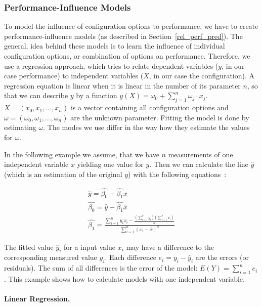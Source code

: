 \subsubsection{Performance-Influence Models}
\label{lin_reg}

To model the influence of configuration options to performance, we have to create performance-influence models (as described in Section~\ref{rel_perf_pred}). The general, idea behind these models is to learn the influence of individual configuration options, or combination of options on performance. Therefore, we use a regression approach, which tries to relate dependent variables ($y$, in our case performance) to independent variables ($X$, in our case the configuration). A regression equation is linear when it is linear in the number of its parameter $n$, so that we can describe $y$ by a function $y(X) = \omega_0 + \sum_{j=1}^n \omega_j \cdot x_j$. $X = (x_0, x_1, ..., x_n)$ is a vector containing all configuration options and $\omega = (\omega_0, \omega_1, ..., \omega_n)$ are the unknown parameter. Fitting the model is done by estimating $\omega$. The modes we use differ in the way how they estimate the values for $\omega$.

In the following example we assume, that we have $n$ measurements of one independent variable $x$ yielding one value for $y$. Then we can calculate the line $\hat{y}$ (which is an estimation of the original $y$) with the following equations~\cite{hahn1967statistical}:

\begin{equation}
    \label{def:LinReg:equation}
    \begin{aligned}
        \hat{y}=\hat{\beta_0} + \hat{\beta_1}x
        \\
        \hat{\beta_0}=\hat y - \hat{\beta_1} \bar x
        \\
        \hat{\beta_1}=\frac{\sum_{i=1}^ny_ix_i-\frac{(\sum_{i=1}^ny_i)(\sum_{i=1}^nx_i)}{n}}{\sum_{i=1}^n(x_i- \bar x)^2}
    \end{aligned}
\end{equation}

The fitted value $\hat y_i$ for a input value $x_i$ may have a difference to the corresponding measured value $y_i$. Each difference $e_i=y_i-\hat y_i$ are the errors (or residuals). The sum of all differences is the error of the model: $E(Y)=\sum_{i=1}^ne_i$. This example shows how to calculate models with one independent variable. 


\paragraph{Linear Regression.}

